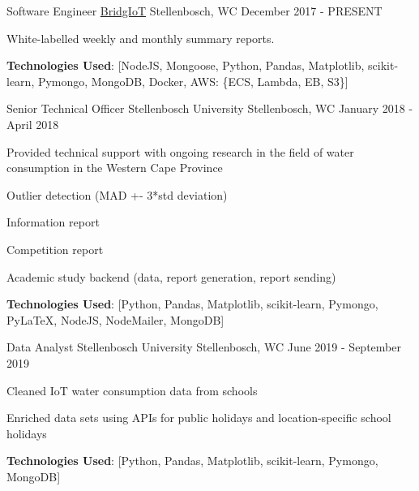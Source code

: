 
\begin{cventries}
  \cventry
    {Software Engineer} %
    {\href{https://www.bridgiot.co.za/}{BridgIoT}} %
    {Stellenbosch, WC} %
    {December 2017 - PRESENT} %
    {
      \begin{cvitems} %
        \item {White-labelled weekly and monthly summary reports.}
        \item {\textbf{Technologies Used}: [NodeJS, Mongoose,
                                            Python, Pandas, Matplotlib, scikit-learn, Pymongo,
                                            MongoDB,
                                            Docker,
                                            AWS: \{ECS, Lambda, EB, S3\}]}
      \end{cvitems}
    }

  \cventry
    {Senior Technical Officer} %
    {Stellenbosch University} %
    {Stellenbosch, WC} %
    {January 2018 - April 2018} %
    {
      \begin{cvitems} %
        \item {Provided technical support with ongoing research in the field of water consumption in the Western Cape Province}
        \item {Outlier detection (MAD +- 3*std deviation) }
        \item {Information report}
        \item {Competition report}
        \item {Academic study backend (data, report generation, report sending) }
        \item {\textbf{Technologies Used}: [Python, Pandas, Matplotlib, scikit-learn, Pymongo, PyLaTeX,
                                            NodeJS, NodeMailer,
                                            MongoDB]}
      \end{cvitems}
    }

  \cventry
    {Data Analyst} %
    {Stellenbosch University} %
    {Stellenbosch, WC} %
    {June 2019 - September 2019} %
    {
      \begin{cvitems} %
        \item {Cleaned IoT water consumption data from schools}
        \item {Enriched data sets using APIs for public holidays and location-specific school holidays}
        \item {\textbf{Technologies Used}: [Python, Pandas, Matplotlib, scikit-learn, Pymongo, MongoDB]}
      \end{cvitems}
    }


\end{cventries}
